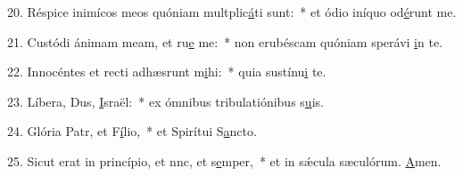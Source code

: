 20. Réspice inimícos meos quóniam multplic\uline{á}ti sunt:~* et ódio iníquo od\uline{é}runt me.\par 
21. Custódi ánimam meam, et ru\uline{e} me:~* non erubéscam quóniam sperávi \uline{i}n te.\par 
22. Innocéntes et recti adhæsrunt m\uline{i}hi:~* quia sustínu\uline{i} te.\par 
23. Líbera, Dus, \uline{I}sraël:~* ex ómnibus tribulatiónibus s\uline{u}is.\par 
24. Glória Patr, et F\uline{í}lio,~* et Spirítui S\uline{a}ncto.\par 
25. Sicut erat in princípio, et nnc, et s\uline{e}mper,~* et in sǽcula sæculórum. \uline{A}men.\par 
